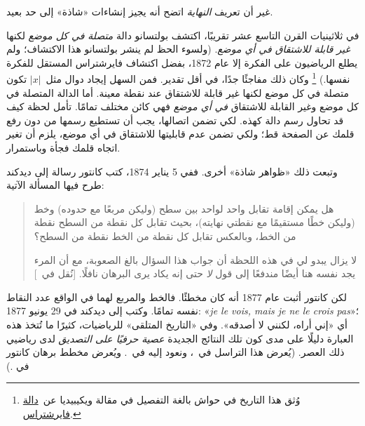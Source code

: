 \documentclass[../../../include/open-logic-section]{subfiles}
\begin{document}

غير أن تعريف \emph{النهاية} اتضح أنه يجيز إنشاءات «شاذة» إلى حد بعيد.

في ثلاثينيات القرن التاسع عشر تقريبًا، اكتشف بولتسانو دالة
\emph{متصلة في كل موضع} لكنها \emph{غير قابلة للاشتقاق في أي موضع}.
(ولسوء الحظ لم ينشر بولتسانو هذا الاكتشاف؛ ولم يطلع الرياضيون على
الفكرة إلا عام 1872، بفضل اكتشاف فايرشتراس المستقل للفكرة نفسها.)
\footnote{وُثق هذا التاريخ في حواش بالغة التفصيل في مقالة ويكيبيديا
عن~\href{http://en.wikipedia.org/wiki/Weierstrass_function}{دالة
فايرشتراس}.} وكان ذلك مفاجئًا جدًا، في أقل تقدير. فمن السهل إيجاد دوال
مثل~$|x|$ تكون متصلة في كل موضع لكنها غير قابلة للاشتقاق عند نقطة
معينة. أما الدالة المتصلة في كل موضع وغير القابلة للاشتقاق
\emph{في أي موضع} فهي كائن مختلف تمامًا. تأمل لحظة كيف قد تحاول رسم
دالة كهذه. لكي تضمن اتصالها، يجب أن تستطيع رسمها من دون رفع قلمك عن
الصفحة قط؛ ولكي تضمن عدم قابليتها للاشتقاق في أي موضع، يلزم أن تغير
اتجاه قلمك فجأة وباستمرار.

وتبعت ذلك «ظواهر شاذة» أخرى. ففي 5 يناير 1874، كتب كانتور رسالة إلى
ديدكند طرح فيها المسألة الآتية:
\begin{quote}
هل يمكن إقامة تقابل واحد لواحد بين سطح (وليكن مربعًا مع حدوده) وخط
(وليكن خطًا مستقيمًا مع نقطتي نهايته)، بحيث تقابل كل نقطة من السطح
نقطة من الخط، وبالعكس تقابل كل نقطة من الخط نقطة من السطح؟

لا يزال يبدو لي في هذه اللحظة أن جواب هذا السؤال بالغ الصعوبة، مع أن
المرء يجد نفسه هنا أيضًا مندفعًا إلى قول \emph{لا} حتى إنه يكاد يرى
البرهان نافلًا.
[نُقل في~\citealt{Gouvea2011}]
\end{quote}
لكن كانتور أثبت عام 1877 أنه كان مخطئًا. فالخط والمربع لهما في الواقع
عدد النقاط نفسه تمامًا. وكتب إلى ديدكند في 29 يونيو 1877:
«\emph{je le vois, mais je ne le crois pas}»؛ أي «إني أراه، لكنني لا
أصدقه». وفي «التاريخ المتلقى» للرياضيات، كثيرًا ما تُتخذ هذه العبارة
دليلًا على مدى كون تلك النتائج الجديدة \emph{عصية حرفيًا على التصديق}
لدى رياضيي ذلك العصر. (يُعرض هذا التراسل في~\citet{Gouvea2011}، ونعود
إليه في~. ويُعرض مخطط برهان كانتور في
.)
\end{document}

